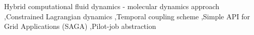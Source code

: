 \documentclass[preprint,12pt]{elsarticle}
\begin{document}
\begin{frontmatter}
\begin{abstract}
\end{abstract}

\begin{keyword}
Hybrid computational fluid dynamics - molecular dynamics approach 
\sep Constrained Lagrangian dynamics 
\sep Temporal coupling scheme 
\sep Simple API for Grid Applications (SAGA)
\sep Pilot-job abstraction
\end{keyword}

\end{frontmatter}
\end{document}

